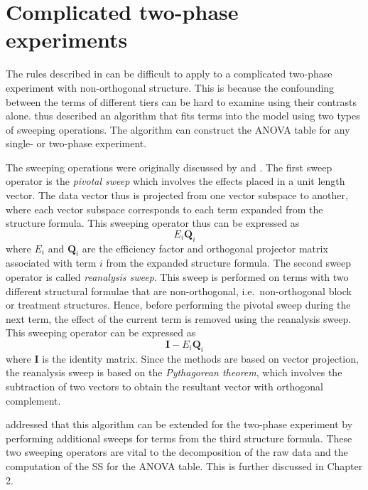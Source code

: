 \documentclass[11pt,a4paper]{article}
\begin{document}
\section{Complicated two-phase experiments}
The rules described in \cite{Brien1983} can be difficult to apply to a complicated two-phase experiment with non-orthogonal structure. This is because the confounding between the terms of different tiers can be hard to examine using their contrasts alone. \cite{Brien1999} thus described an algorithm that fits terms into the model using two types of sweeping operations.  The algorithm can construct the ANOVA table for any single- or two-phase experiment. 

The sweeping operations were originally discussed by \cite{Wilkinson1970} and \cite{Payne1977}. The first sweep operator is the \emph{pivotal sweep} which involves the effects placed in a unit length vector. The data vector thus is projected from one vector subspace to another, where each vector subspace corresponds to each term expanded from the structure formula. This sweeping operator thus can be expressed as 
\begin{equation}
E_i \mathbf{Q}_i
\end{equation}
where $E_i$ and $\mathbf{Q}_i$ are the efficiency factor and orthogonal projector matrix associated with term $i$ from the expanded structure formula. The second sweep operator is called \emph{reanalysis sweep}. This sweep is performed on terms with two different structural formulae that are non-orthogonal, i.e.\ non-orthogonal block or treatment structures. Hence, before performing the pivotal sweep during the next term, the effect of the current term is removed using the reanalysis sweep. This sweeping operator can be expressed as 
\begin{equation}
\mathbf{I} - E_i \mathbf{Q}_i
\end{equation}
where $\mathbf{I}$ is the identity matrix. Since the methods are based on vector projection, the reanalysis sweep is based on the \emph{Pythagorean theorem}, which involves the subtraction of two vectors to obtain the resultant vector with orthogonal complement.

\cite{Brien1999} addressed that this algorithm can be extended for the two-phase experiment by performing additional sweeps for terms from the third structure formula. These two sweeping operators are vital to the decomposition of the raw data and the computation of the SS for the ANOVA table. This is further discussed in Chapter 2.
\end{document}
